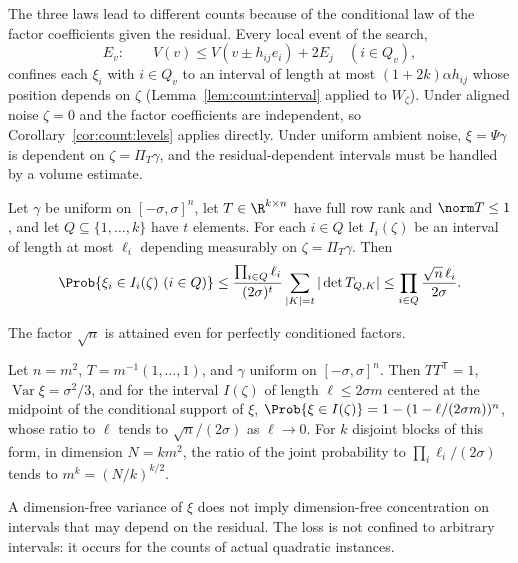 The three laws lead to different counts because of the conditional law of
the factor coefficients given the residual. Every local event of the search,
\[
 E_v:\qquad V(v)\le V(v\pm h_{ij}e_i)+2E_j\quad(i\in Q_v),
\]
confines each $\xi_i$ with $i\in Q_v$ to an interval of length at most
$(1+2k)\alpha h_{ij}$ whose position depends on $\zeta$
(Lemma~\ref{lem:count:interval} applied to $W_\zeta$). Under aligned noise
$\zeta=0$ and the factor coefficients are independent, so
Corollary~\ref{cor:count:levels} applies directly. Under uniform ambient
noise, $\xi=\Psi\gamma$ is dependent on $\zeta=\Pi_T\gamma$, and the
residual-dependent intervals must be handled by a volume estimate.

\begin{lemma}\label{lem:qp:volume}
Let $\gamma$ be uniform on $[-\sigma,\sigma]^n$, let $T\in\R^{k\times n}$ have
full row rank and $\norm T\le1$, and let $Q\subseteq\{1,\dots,k\}$ have $t$
elements. For each $i\in Q$ let $I_i(\zeta)$ be an interval of length at most
$\ell_i$ depending measurably on $\zeta=\Pi_T\gamma$. Then
\[
 \Prob\{\xi_i\in I_i(\zeta)\ (i\in Q)\}
 \le\frac{\prod_{i\in Q}\ell_i}{(2\sigma)^t}\sum_{|K|=t}|\det T_{Q,K}|
 \le\prod_{i\in Q}\frac{\sqrt n\,\ell_i}{2\sigma}.
\]
\end{lemma}

The factor $\sqrt n$ is attained even for perfectly conditioned factors.

\begin{proposition}\label{prop:qp:fiber-sharp}
Let $n=m^2$, $T=m^{-1}(1,\dots,1)$, and $\gamma$ uniform on
$[-\sigma,\sigma]^n$. Then $TT^{\mathsf T}=1$, $\operatorname{Var}\xi=\sigma^2/3$,
and for the interval $I(\zeta)$ of length $\ell\le2\sigma m$ centered at the
midpoint of the conditional support of $\xi$,
$\Prob\{\xi\in I(\zeta)\}=1-(1-\ell/(2\sigma m))^n$, whose ratio to $\ell$
tends to $\sqrt n/(2\sigma)$ as $\ell\to0$. For $k$ disjoint blocks of this
form, in dimension $N=km^2$, the ratio of the joint probability to
$\prod_i\ell_i/(2\sigma)$ tends to $m^k=(N/k)^{k/2}$.
\end{proposition}

A dimension-free variance of $\xi$ does not imply dimension-free
concentration on intervals that may depend on the residual. The loss is not
confined to arbitrary intervals: it occurs for the counts of actual quadratic
instances.

